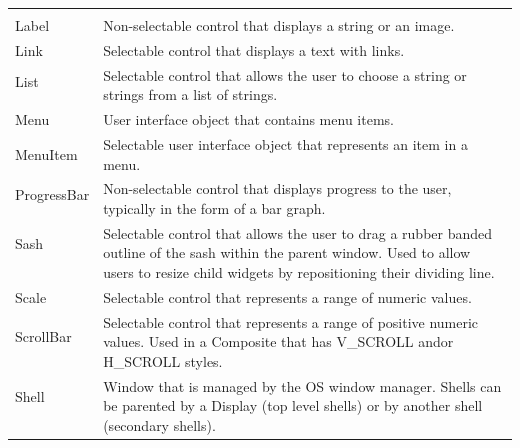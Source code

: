 \begin{center}
\begin{tabular}{l|l}
&\\
Label & Non-selectable control that displays a string or an image.\\
Link & Selectable control that displays a text with links.\\
List & \multirow{2}{*}{\parbox{12cm}{Selectable control that allows the user to choose a string or strings from a list of strings.}}\\
&\\
Menu & User interface object that contains menu items.\\
MenuItem & Selectable user interface object that represents an item in a menu.\\
ProgressBar & \multirow{2}{*}{\parbox{12cm}{Non-selectable control that displays progress to the user, typically in the form of a bar graph.}}\\
&\\
Sash & \multirow{3}{*}{\parbox{12cm}{Selectable control that allows the user to drag a rubber banded outline of the sash within the parent window. Used to allow users to resize child widgets by repositioning their dividing line.}}\\
&\\
&\\
Scale & Selectable control that represents a range of numeric values.\\
ScrollBar & \multirow{2}{*}{\parbox{12cm}{Selectable control that represents a range of positive numeric values. Used in a Composite that has V\_SCROLL and\/or H\_SCROLL styles.}}\\
&\\
Shell & \multirow{3}{*}{\parbox{12cm}{Window that is managed by the OS window manager. Shells can be parented by a Display (top level shells) or by another shell (secondary shells).}}\\
&\\
&\\
\end{tabular}
\end{center}
